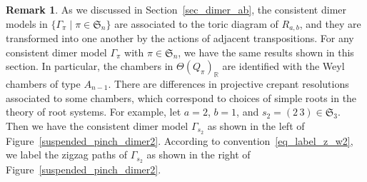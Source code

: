 \documentclass[pdftex]{sigma}
\numberwithin{equation}{section}
\theoremstyle{definition}
\newtheorem{Remark}[Theorem]{Remark}
\newcommand{\RR}{\mathbb{R}}
\newcommand{\fkS}{\mathfrak{S}}
\newcommand{\perm}{\pi}
\begin{document}
\begin{Remark}
As we discussed in Section~\ref{sec_dimer_ab}, the consistent dimer models in $\{\Gamma_\perm \mid \perm\in\fkS_n\}$ are associated to
the toric diagram of $R_{a,b}$, and they are transformed into one another by the actions of adjacent transpositions.
For any consistent dimer model $\Gamma_\perm$ with $\perm\in\fkS_n$, we have the same results shown in this section.
In particular, the chambers in $\Theta(Q_\perm)_\RR$ are identified with the Weyl chambers of type $A_{n-1}$.
There are differences in projective crepant resolutions associated to some chambers, which correspond to choices of simple roots
in the theory of root systems.
For example, let $a=2$, $b=1$, and $s_2=(2\, 3)\in\fkS_3$.
Then we have the consistent dimer model $\Gamma_{s_2}$ as shown in the left of Figure~\ref{suspended_pinch_dimer2}.
According to convention~\eqref{eq_label_z_w2}, we label the zigzag paths of $\Gamma_{s_2}$ as shown in the right of Figure~\ref{suspended_pinch_dimer2}.

\begin{figure}[!ht]\centering
{}
\end{figure}
\end{Remark}
\end{document}
